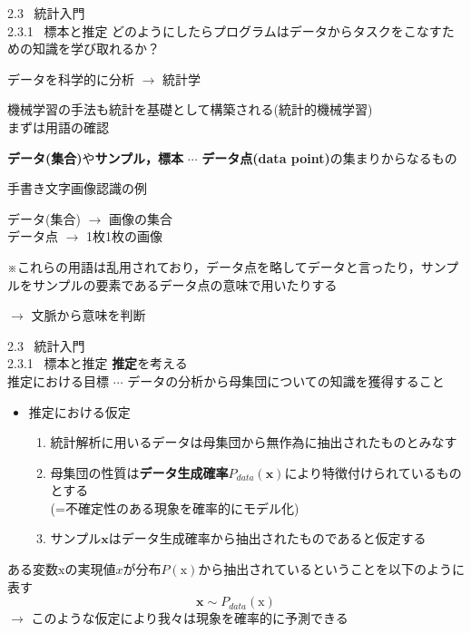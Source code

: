 \documentclass[dvipdfmx,10pt]{beamer}
\begin{document}
  \begin{frame}{2.3 \ 統計入門 \\ \normalsize{2.3.1 \ 標本と推定}}
    どのようにしたらプログラムはデータからタスクをこなすための知識を学び取れるか？\\
    \begin{center}
      データを科学的に分析 $\rightarrow$ 統計学
    \end{center}
    機械学習の手法も統計を基礎として構築される(統計的機械学習)\\
    まずは用語の確認\\
    \begin{center}
      \textbf{データ(集合)}や\textbf{サンプル，標本} $\cdots$ \textbf{データ点(data point)}の集まりからなるもの\\
    \end{center}
    \begin{exampleblock}{手書き文字画像認識の例}
      \begin{center}
        データ(集合) $\rightarrow$ 画像の集合\\
        データ点 $\rightarrow$ 1枚1枚の画像
      \end{center}
    \end{exampleblock}
    \vspace{0.2cm}
    ※これらの用語は乱用されており，データ点を略してデータと言ったり，サンプルをサンプルの要素であるデータ点の意味で用いたりする\\
    \begin{center}
      $\rightarrow$ 文脈から意味を判断
    \end{center}
  \end{frame}

  \begin{frame}[t]{2.3 \ 統計入門 \\ \normalsize{2.3.1 \ 標本と推定}}
    \textbf{推定}を考える\\
    推定における目標 $\cdots$ データの分析から母集団についての知識を獲得すること
    \begin{itemize}
      \item 推定における仮定
      \begin{enumerate}
        \item 統計解析に用いるデータは母集団から無作為に抽出されたものとみなす 
        \item 母集団の性質は\textbf{データ生成確率}$P_{data}(\bm{x})$により特徴付けられているものとする\\
        (=不確定性のある現象を確率的にモデル化)
        \item サンプル$\bm{x}$はデータ生成確率から抽出されたものであると仮定する
      \end{enumerate}
    \end{itemize}
    ある変数$\mathrm{x}$の実現値$x$が分布$P(\mathrm{x})$から抽出されているということを以下のように表す
    \begin{equation*}
      \bm{x} \sim P_{data}(\bm{\mathrm{x}})
    \end{equation*}
    $\rightarrow$ このような仮定により我々は現象を確率的に予測できる
  \end{frame}
\end{document}
